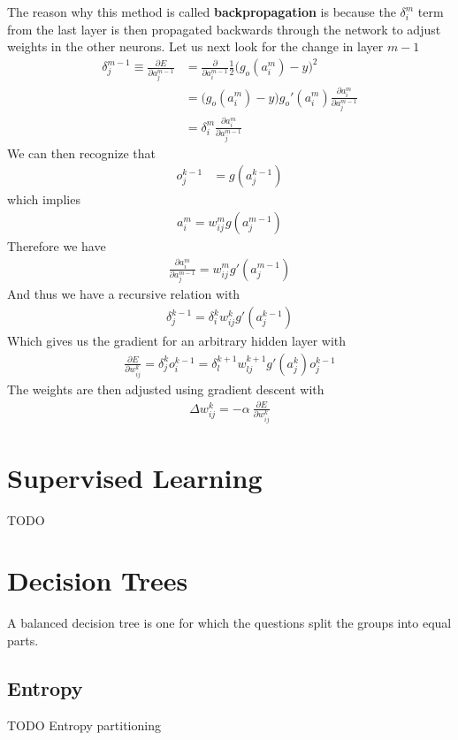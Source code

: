 The reason why this method is called \textbf{backpropagation} is because the $\delta_i^m$ term from the last layer is then propagated backwards through the network to adjust weights in the other neurons. Let us next look for the change in layer $m-1$
\begin{align}
	\delta_j^{m-1} \equiv \frac{\partial E}{\partial a_{j}^{m-1}} &= \frac{\partial}{\partial{a_i^{m-1}}}\frac{1}{2}\Big(g_o(a_{i}^m)-y\Big)^2 \\
	&=\Big(g_o(a_{i}^m)-y\Big)g_o'(a_{i}^m)\frac{\partial a_{i}^m}{\partial a_{j}^{m-1}}\\
	&= \delta_i^m \frac{\partial a_{i}^m}{\partial a_{j}^{m-1}}
\end{align}
We can then recognize that
\begin{align}
	o_j^{k-1} &= g(a_j^{k-1})
\end{align}
which implies
\begin{align}
	a_i^m = w_{ij}^m g(a_j^{m-1})
\end{align}
Therefore we have
\begin{align}
	\frac{\partial a_{i}^m}{\partial a_{j}^{m-1}} = w_{ij}^m g'(a_j^{m-1})
\end{align}
And thus we have a recursive relation with
\begin{align}
	\delta_j^{k-1} = \delta_i^k w_{ij}^k g'(a_j^{k-1})
\end{align}
Which gives us the gradient for an arbitrary hidden layer with
\begin{align}
	\frac{\partial E}{\partial w_{ij}^k} = \delta_j^{k}o_i^{k-1} = \delta_l^{k+1} w_{lj}^{k+1} g'(a_j^{k})o_j^{k-1}
\end{align}
The weights are then adjusted using gradient descent with
\begin{align}
	\Delta w_{ij}^k = -\alpha~  \frac{\partial E}{\partial w_{ij}^k}
\end{align}

\section{Supervised Learning}
TODO

\section{Decision Trees}
A balanced decision tree is one for which the questions split the groups into equal parts.

\subsection{Entropy}
TODO Entropy partitioning

